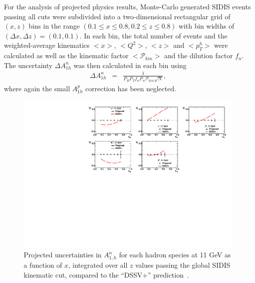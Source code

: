 For the analysis of projected physics results, Monte-Carlo generated SIDIS events passing all cuts were subdivided into a two-dimensional rectangular grid of $(x,z)$ bins in the range $(0.1 \le x \le 0.8, 0.2 \le z \le 0.8)$ with bin widths of $(\Delta x, \Delta z) = (0.1, 0.1)$. In each bin, the total number of events and the weighted-average kinematics $<x>$, $<Q^2>$, $<z>$ and $<p_T^h>$ were calculated as well as the kinematic factor $<\mathcal{P}_{kin}>$ and the dilution factor $f_n$. The uncertainty $\Delta A_{1h}^n$ was then calculated in each bin using 
\begin{eqnarray}
  \Delta A_{1h}^n &=& \frac{1}{P_BP_T f_n P_n \mathcal{P}_{kin}\sqrt{N}}\label{da1nh}, 
\end{eqnarray}
where again the small $A_{1h}^p$ correction has been neglected. 

\begin{figure}[h]
  \begin{center}
    \includegraphics[width=.98\textwidth]{figures/Projections1D_summary11gev.pdf}
  \end{center}
  \caption{\label{projections1D_11gev} Projected uncertainties in $A_{1,h}^n$ for each hadron species at 11 GeV as a function of $x$, integrated over all $z$ values passing the global SIDIS kinematic cut, compared to the ``DSSV+'' prediction~\cite{DSSVplus}.}
\end{figure}

